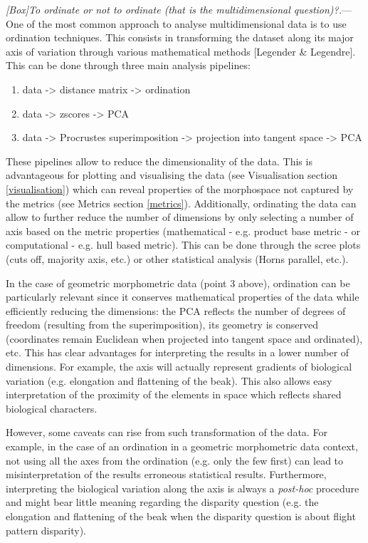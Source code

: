 \documentclass[12pt,letterpaper]{article}
\renewcommand{\subsubsection}[1]{%
\vspace{2ex}
\noindent
\textit{#1.}---}
\begin{document}
\subsubsection{[Box]To ordinate or not to ordinate (that is the multidimensional question)?}
One of the most common approach to analyse multidimensional data is to use ordination techniques.
This consists in transforming the dataset along its major axis of variation through various mathematical methods [Legender \& Legendre].
This can be done through three main analysis pipelines:
\begin{enumerate}
    \item data -> distance matrix -> ordination
    \item data -> zscores -> PCA
    \item data -> Procrustes superimposition -> projection into tangent space -> PCA
\end{enumerate}

These pipelines allow to reduce the dimensionality of the data.
This is advantageous for plotting and visualising the data (see Visualisation section \ref{visualisation}) which can reveal properties of the morphospace not captured by the metrics (see Metrics section \ref{metrics}).
Additionally, ordinating the data can allow to further reduce the number of dimensions by only selecting a number of axis based on the metric properties (mathematical - e.g. product base metric - or computational - e.g. hull based metric).
This can be done through the scree plots (cuts off, majority axis, etc.) or other statistical analysis (Horns parallel, etc.).

In the case of geometric morphometric data (point 3 above), ordination can be particularly relevant since it conserves mathematical properties of the data while efficiently reducing the dimensions: the PCA reflects the number of degrees of freedom (resulting from the superimposition), its geometry is conserved (coordinates remain Euclidean when projected into tangent space and ordinated), etc.
This has clear advantages for interpreting the results in a lower number of dimensions.
For example, the axis will actually represent gradients of biological variation (e.g. elongation and flattening of the beak).
This also allows easy interpretation of the proximity of the elements in space which reflects shared biological characters.

However, some caveats can rise from such transformation of the data.
For example, in the case of an ordination in a geometric morphometric data context, not using all the axes from the ordination (e.g. only the few first) can lead to misinterpretation of the results erroneous statistical results.
Furthermore, interpreting the biological variation along the axis is always a \textit{post-hoc} procedure and might bear little meaning regarding the disparity question (e.g. the elongation and flattening of the beak when the disparity question is about flight pattern disparity).
\end{document}
